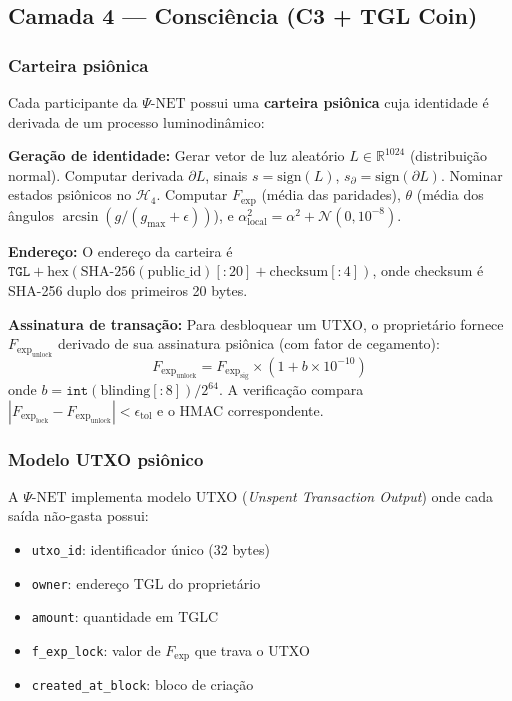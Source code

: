 \documentclass[12pt,a4paper]{article}
\newcommand{\alphaii}{\alpha^2}
\newcommand{\Fexp}{F_{\text{exp}}}
\newcommand{\Hfour}{\mathcal{H}_4}
\newcommand{\PsiNet}{\Psi\text{-NET}}
\begin{document}
\subsection{Camada 4 --- Consciência (C3 + TGL Coin)}

\subsubsection{Carteira psiônica}

Cada participante da $\PsiNet$ possui uma \textbf{carteira
psiônica} cuja identidade é derivada de um processo
luminodinâmico:

\textbf{Geração de identidade:} Gerar vetor de luz aleatório
$L \in \mathbb{R}^{1024}$ (distribuição normal). Computar
derivada $\partial L$, sinais $s = \text{sign}(L)$,
$s_\partial = \text{sign}(\partial L)$. Nominar estados
psiônicos no $\Hfour$. Computar $\Fexp$ (média das paridades),
$\theta$ (média dos ângulos $\arcsin(g/(g_{\max} + \epsilon))$),
e $\alphaii_{\text{local}} = \alphaii + \mathcal{N}(0, 10^{-8})$.

\textbf{Endereço:} O endereço da carteira é
$\texttt{TGL} + \text{hex}(\text{SHA-256}(\text{public\_id})[:20]
+ \text{checksum}[:4])$, onde checksum é SHA-256 duplo dos
primeiros 20 bytes.

\textbf{Assinatura de transação:} Para desbloquear um UTXO, o
proprietário fornece $\Fexp_{\text{unlock}}$ derivado de sua
assinatura psiônica (com fator de cegamento):
\begin{equation}
\Fexp_{\text{unlock}} = \Fexp_{\text{sig}} \times
  (1 + b \times 10^{-10})
\end{equation}
onde $b = \texttt{int}(\text{blinding}[:8]) / 2^{64}$. A
verificação compara $|\Fexp_{\text{lock}} -
\Fexp_{\text{unlock}}| < \epsilon_{\text{tol}}$ e o HMAC
correspondente.

\subsubsection{Modelo UTXO psiônico}

A $\PsiNet$ implementa modelo UTXO (\textit{Unspent Transaction
Output}) onde cada saída não-gasta possui:

\begin{itemize}[nosep]
\item \texttt{utxo\_id}: identificador único (32 bytes)
\item \texttt{owner}: endereço TGL do proprietário
\item \texttt{amount}: quantidade em TGLC
\item \texttt{f\_exp\_lock}: valor de $\Fexp$ que trava o UTXO
\item \texttt{created\_at\_block}: bloco de criação
\end{itemize}
\end{document}
